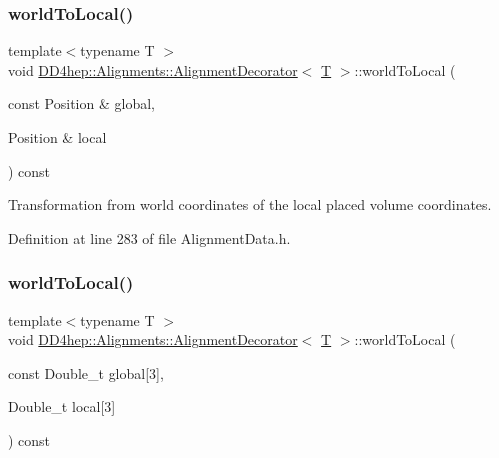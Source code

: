 \subsubsection{\texorpdfstring{world\+To\+Local()}{worldToLocal()}\hspace{0.1cm}{\footnotesize\ttfamily [1/2]}}
{\footnotesize\ttfamily template$<$typename T $>$ \\
void \hyperlink{class_d_d4hep_1_1_alignments_1_1_alignment_decorator}{D\+D4hep\+::\+Alignments\+::\+Alignment\+Decorator}$<$ \hyperlink{class_t}{T} $>$\+::world\+To\+Local (\begin{DoxyParamCaption}\item[{const Position \&}]{global,  }\item[{Position \&}]{local }\end{DoxyParamCaption}) const\hspace{0.3cm}{\ttfamily [inline]}}



Transformation from world coordinates of the local placed volume coordinates. 



Definition at line 283 of file Alignment\+Data.\+h.

\hypertarget{class_d_d4hep_1_1_alignments_1_1_alignment_decorator_aa88ffdd4bbbcbb7879828b3df405db31}{}\label{class_d_d4hep_1_1_alignments_1_1_alignment_decorator_aa88ffdd4bbbcbb7879828b3df405db31} 
\subsubsection{\texorpdfstring{world\+To\+Local()}{worldToLocal()}\hspace{0.1cm}{\footnotesize\ttfamily [2/2]}}
{\footnotesize\ttfamily template$<$typename T $>$ \\
void \hyperlink{class_d_d4hep_1_1_alignments_1_1_alignment_decorator}{D\+D4hep\+::\+Alignments\+::\+Alignment\+Decorator}$<$ \hyperlink{class_t}{T} $>$\+::world\+To\+Local (\begin{DoxyParamCaption}\item[{const Double\+\_\+t}]{global\mbox{[}3\mbox{]},  }\item[{Double\+\_\+t}]{local\mbox{[}3\mbox{]} }\end{DoxyParamCaption}) const\hspace{0.3cm}{\ttfamily [inline]}}




